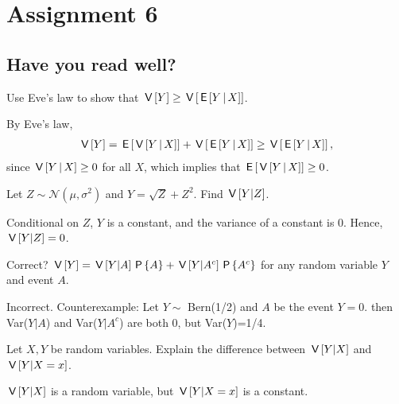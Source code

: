 \documentclass[assignments]{subfiles}
\begin{document}
\setcounter{section}{5}
\section{Assignment 6}


\subsection{Have you read well?}

\begin{exercise}
Use Eve's law to show that $\,\mathsf{V}\left[Y\right] \geq \,\mathsf{V}\left[\,\mathsf{E}\left[Y\,\middle|\, X\right]\right]$.
\begin{solution}
By Eve's law,
\begin{align}
    \,\mathsf{V}\left[Y\right] = \,\mathsf{E}\left[\,\mathsf{V}\left[Y\,\middle|\, X\right]\right] + \,\mathsf{V}\left[\,\mathsf{E}\left[Y\,\middle|\, X\right]\right] \geq \,\mathsf{V}\left[\,\mathsf{E}\left[Y\,\middle|\, X\right]\right],
\end{align}
since $\,\mathsf{V}\left[Y\,\middle|\, X\right] \geq 0$ for all $X$, which implies that $\,\mathsf{E}\left[\,\mathsf{V}\left[Y\,\middle|\, X\right]\right] \geq 0$.
\end{solution}
\end{exercise}


\begin{exercise}
Let $Z\sim \mathcal{N}(\mu, \sigma^2)$ and $Y=\sqrt{Z}+Z^2.$ Find $\,\mathsf{V}\left[Y|Z\right]$.
\begin{solution}
Conditional on $Z$, $Y$ is a constant, and the variance of a constant is 0. Hence, $\,\mathsf{V}\left[Y|Z\right] = 0$.
\end{solution}
\end{exercise}


\begin{exercise}
Correct? $\,\mathsf{V}\left[Y\right]=\,\mathsf{V}\left[Y|A\right]\,\mathsf{P}\left\{A\right\}+\,\mathsf{V}\left[Y|A^c\right]\,\mathsf{P}\left\{A^c\right\}$ for any random variable $Y$ and event $A$.

\begin{solution}
Incorrect. Counterexample: Let $Y\sim$ Bern(1/2) and $A$ be the event $Y=0$. then Var($Y|A$) and Var($Y|A^c$) are both 0, but Var($Y$)=1/4.
\end{solution}
\end{exercise}


\begin{exercise}
Let $X, Y$ be random variables. Explain the difference between $\,\mathsf{V}\left[Y|X\right]$ and $\,\mathsf{V}\left[Y|X=x\right]$.

\begin{solution}
$\,\mathsf{V}\left[Y|X\right]$ is a random variable, but $\,\mathsf{V}\left[Y|X=x\right]$ is a constant.
\end{solution}
\end{exercise}
\end{document}
